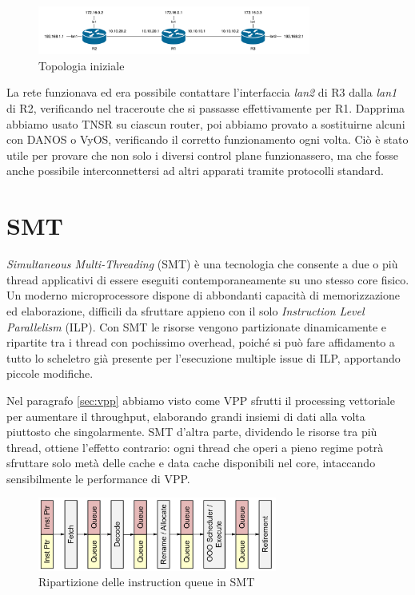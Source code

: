 \begin{figure}[htb]
    \includegraphics[width=0.8\textwidth]{graphics/bgp-topo-1.png}
    \caption{Topologia iniziale}
    \label{fig:bgp-topo-1}
\end{figure}

La rete funzionava ed era possibile contattare l'interfaccia \textit{lan2} di R3 dalla \textit{lan1} di R2, verificando nel traceroute che si passasse effettivamente per R1. Dapprima abbiamo usato TNSR su ciascun router, poi abbiamo provato a sostituirne alcuni con DANOS o VyOS, verificando il corretto funzionamento ogni volta. Ciò è stato utile per provare che non solo i diversi control plane funzionassero, ma che fosse anche possibile interconnettersi ad altri apparati tramite protocolli standard.

\section{SMT}

\textit{Simultaneous Multi-Threading} (SMT) è una tecnologia che consente a due o più thread applicativi di essere eseguiti contemporaneamente su uno stesso core fisico. Un moderno microprocessore dispone di abbondanti capacità di memorizzazione ed elaborazione, difficili da sfruttare appieno con il solo \textit{Instruction Level Parallelism} (ILP). Con SMT le risorse vengono partizionate dinamicamente e ripartite tra i thread con pochissimo overhead, poiché si può fare affidamento a tutto lo scheletro già presente per l'esecuzione multiple issue di ILP, apportando piccole modifiche.

Nel paragrafo \ref{sec:vpp} abbiamo visto come VPP sfrutti il processing vettoriale per aumentare il throughput, elaborando grandi insiemi di dati alla volta piuttosto che singolarmente. SMT d'altra parte, dividendo le risorse tra più thread, ottiene l'effetto contrario: ogni thread che operi a pieno regime potrà sfruttare solo metà delle  cache e data cache disponibili nel core, intaccando sensibilmente le performance di VPP.

\begin{figure}[htb]
    \includegraphics[width=0.7\textwidth]{graphics/smt.png}
    \caption{Ripartizione delle instruction queue in SMT}
    \label{fig:smt}
\end{figure}

